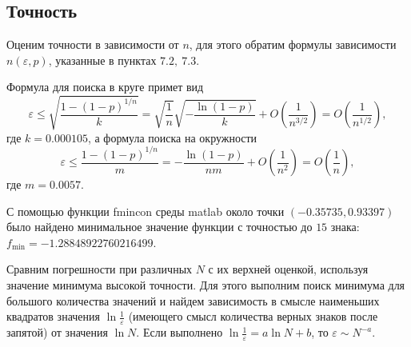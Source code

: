 \documentclass[12pt, a4paper]{article}
\begin{document}
\subsection{Точность}
Оценим точности в зависимости от $n$, для этого обратим формулы зависимости $n(\varepsilon,p)$, указанные в пунктах $7.2,\ 7.3$. 

Формула для поиска в круге примет вид
\[ \varepsilon \leqslant \sqrt{\frac{1-(1-p)^{1/n}}{k}} = \sqrt{\frac{1}{n}}\sqrt{-\frac{\ln(1-p)}{k}} + O\left(\frac{1}{n^{3/2}}\right) = O\left(\frac{1}{n^{1/2}}\right), \]
где $k = 0.000105$, а формула поиска на окружности
\[\varepsilon \leqslant \frac{1-(1-p)^{1/n}}{m} = -\frac{\ln(1-p)}{nm}+O\left( \frac 1{n^2} \right) = O \left( \frac 1n \right),\]
где $m=0.0057$.

С помощью функции fmincon среды matlab около точки $(-0.35735, 0.93397)$ было найдено минимальное значение функции с точностью до $15$ знака: $f_{\min} =-1.28848922760216499$. 

Сравним погрешности при различных $N$ с их верхней оценкой, используя значение минимума высокой точности. Для этого выполним поиск минимума для большого количества значений и найдем зависимость в смысле наименьших квадратов значения $\ln{\frac 1\varepsilon}$ (имеющего смысл количества верных знаков после запятой) от значения $\ln N$. Если выполнено $\ln{\frac 1\varepsilon} = a\ln N + b$, то $\varepsilon \sim N^{-a}$.
\end{document}
